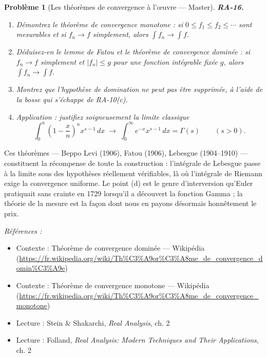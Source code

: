 \documentclass[11pt]{article}
\newtheorem{problem}{Problème}
\newenvironment{refs}{\par\small\noindent\emph{Références :}\begin{itemize}\setlength\itemsep{0pt}}{\end{itemize}\normalsize}
\begin{document}
\bigskip

\begin{problem}[{Les théorèmes de convergence à l'\oe{}uvre --- Master}]
\textbf{RA-16.} \begin{enumerate}
\item[(a)] Démontrez le théorème de convergence monotone : si
$ 0 \le f_1 \le f_2 \le \cdots $ sont mesurables et si $ f_n \to f $ simplement, alors
$ \int f_n \to \int f $.
\item[(b)] Déduisez-en le lemme de Fatou et le théorème de convergence dominée : si
$ f_n \to f $ simplement et $ |f_n| \le g $ pour une fonction intégrable fixée $ g $, alors
$ \int f_n \to \int f $.
\item[(c)] Montrez que l'hypothèse de domination ne peut pas être supprimée, à l'aide de la
bosse qui s'échappe de RA-10(c).
\item[(d)] Application : justifiez soigneusement la limite classique
\[ \int_0^n \left(1 - \frac{x}{n}\right)^n x^{s-1}\,dx \;\longrightarrow\;
\int_0^\infty e^{-x} x^{s-1}\,dx = \Gamma(s) \qquad (s > 0). \]
\end{enumerate}

\end{problem}

\noindent Ces théorèmes --- Beppo Levi (1906), Fatou (1906), Lebesgue (1904--1910) ---
constituent la récompense de toute la construction : l'intégrale de Lebesgue passe à la limite sous
des hypothèses réellement vérifiables, là où l'intégrale de Riemann exige la convergence uniforme.
Le point (d) est le genre d'interversion qu'Euler pratiquait sans crainte en 1729 lorsqu'il a
découvert la fonction Gamma ; la théorie de la mesure est la façon dont nous en payons désormais
honnêtement le prix.

\begin{refs}
\item Contexte : Théorème de convergence dominée --- Wikipédia (\url{https://fr.wikipedia.org/wiki/Th%C3%A9or%C3%A8me_de_convergence_domin%C3%A9e})
\item Contexte : Théorème de convergence monotone --- Wikipédia (\url{https://fr.wikipedia.org/wiki/Th%C3%A9or%C3%A8me_de_convergence_monotone})
\item Lecture : Stein \& Shakarchi, \textit{Real Analysis}, ch. 2
\item Lecture : Folland, \textit{Real Analysis: Modern Techniques and Their Applications}, ch. 2
\end{refs}

\bigskip
\end{document}
